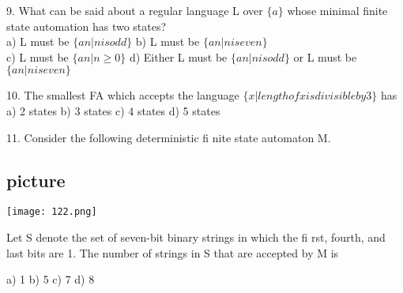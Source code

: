 \documentclass[9pt]{beamer}
\begin{document}
\begin{frame}
9. What can be said about a regular language L over $\{a\}$ whose minimal finite state automation has
two states?\\

\vspace*{0.2cm}
\hspace{0.5cm}
a) L must be $\{an | n is odd\}$     \hspace{0.5cm}   b) L must be $\{an | n is even\}$ \\
\hspace{0.5cm}
c) L must be $\{an | n \geq 0\}$     \hspace{0.5cm}   d) Either L must be $\{an | n is odd\}$ or L must be $\{an | n is even\}$ \\
\vspace*{0.2cm}

10. The smallest FA which accepts the language $\{x | length of x is divisible by 3\}$ has\\

\vspace*{0.2cm}
\hspace{0.5cm}
a) 2 states  \hspace*{0.5cm}  b) 3 states  \hspace*{0.5cm}   c) 4 states  \hspace*{0.5cm}  d) 5 states \\
\vspace*{0.2cm}

11. Consider the following deterministic fi nite state automaton M.\\

\begin{center}
\section{picture}
\texttt{[image: 122.png]}
\end{center}

\hspace{0.5cm}
Let S denote the set of seven-bit binary strings in which the fi rst, fourth, and last bits are 1. The
number of strings in S that are accepted by M is \\
\vspace*{0.2cm}

\hspace{0.5cm}
a) 1  \hspace*{0.5cm}  b) 5  \hspace*{0.5cm}   c) 7  \hspace*{0.5cm}  d) 8 \\
\vspace*{0.2cm}
\end{frame}
\end{document}
